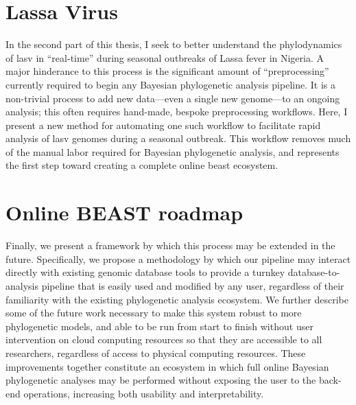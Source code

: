\section{Lassa Virus}
In the second part of this thesis, I seek to better understand the phylodynamics of \gls{lasv} in ``real-time'' during seasonal outbreaks of Lassa fever in Nigeria.
A major hinderance to this process is the significant amount of ``preprocessing'' currently required to begin any Bayesian phylogenetic analysis pipeline.
It is a non-trivial process to add new data---even a single new genome---to an ongoing analysis; this often requires hand-made, bespoke preprocessing workflows.
Here, I present a new method for automating one such workflow to facilitate rapid analysis of \gls{lasv} genomes during a seasonal outbreak.
This workflow removes much of the manual labor required for Bayesian phylogenetic analysis, and represents the first step toward creating a complete online \gls{beast} ecosystem. 

\section{Online BEAST roadmap}

Finally, we present a framework by which this process may be extended in the future.
Specifically, we propose a methodology by which our pipeline may interact directly with existing genomic database tools to provide a turnkey database-to-analysis pipeline that is easily used and modified by any user, regardless of their familiarity with the existing phylogenetic analysis ecosystem.
We further describe some of the future work necessary to make this system robust to more phylogenetic models, and able to be run from start to finish without user intervention on cloud computing resources so that they are accessible to all researchers, regardless of access to physical computing resources.
These improvements together constitute an ecosystem in which full online Bayesian phylogenetic analyses may be performed without exposing the user to the back-end operations, increasing both usability and interpretability.


\cleardoublepage

